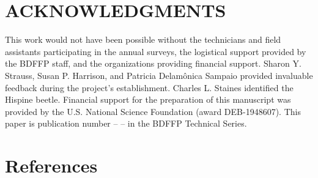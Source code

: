 \documentclass[
  12pt,
  man, donotrepeattitle,floatsintext]{apa6}
\begin{document}
\hypertarget{acknowledgments}{%
\section{ACKNOWLEDGMENTS}\label{acknowledgments}}

\noindent  
This work would not have been possible without the technicians and field assistants participating in the annual surveys, the logistical support provided by the BDFFP staff, and the organizations providing financial support. Sharon Y. Strauss, Susan P. Harrison, and Patricia Delamônica Sampaio provided invaluable feedback during the project's establishment. Charles L. Staines identified the Hispine beetle. Financial support for the preparation of this manuscript was provided by the U.S. National Science Foundation (award DEB-1948607). This paper is publication number -- -- in the BDFFP Technical Series.

\newpage

\hypertarget{references}{%
\section{References}\label{references}}

\begingroup
\setlength{\parindent}{0in}
\setlength{\leftskip}{0in}
\end{document}
